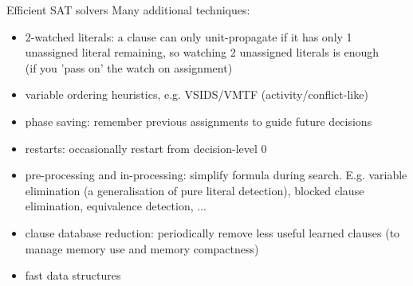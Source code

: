 \documentclass{cons-beamer}
\begin{document}
\begin{frame}{Efficient SAT solvers}
	Many additional techniques:
	\begin{itemize}
		\item 2-watched literals: a clause can only unit-propagate if it has only 1 unassigned literal remaining, so watching 2 unassigned literals is enough\\ (if you 'pass on' the watch on assignment)
		\item variable ordering heuristics, e.g. VSIDS/VMTF (activity/conflict-like)
		\item phase saving: remember previous assignments to guide future decisions
		\item restarts: occasionally restart from decision-level 0
		\item pre-processing and in-processing: simplify formula during search. E.g. variable elimination (a generalisation of pure literal detection), blocked clause elimination, equivalence detection, ...
		\item clause database reduction: periodically remove less useful learned clauses (to manage memory use and memory compactness)
		\item fast data structures
	\end{itemize}
\end{frame}
\end{document}
